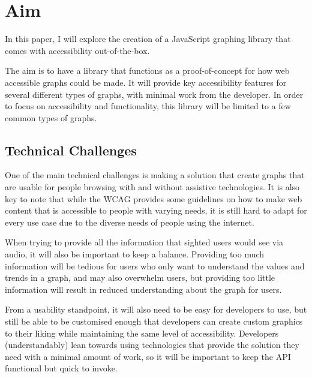 \documentclass[ %
                    author={Aleena Baig},
                supervisor={Dr Simon Lock},
                    degree={BSc},
                     title={On Making Web Accessible Graphs},
                  subtitle={},
                      year={2019} ]{dissertation}
\begin{document}
\section{Aim}

In this paper, I will explore the creation of a JavaScript graphing library that comes with accessibility out-of-the-box.

The aim is to have a library that functions as a proof-of-concept for how web accessible graphs could be made. It will provide key accessibility features for several different types of graphs, with minimal work from the developer. In order to focus on accessibility and functionality, this library will be limited to a few common types of graphs.

\subsection{Technical Challenges}

One of the main technical challenges is making a solution that create graphs that are usable for people browsing with and without assistive technologies. It is also key to note that while the WCAG provides some guidelines on how to make web content that is accessible to people with varying needs, it is still hard to adapt for every use case due to the diverse needs of people using the internet.

When trying to provide all the information that sighted users would see via audio, it will also be important to keep a balance. Providing too much information will be tedious for users who only want to understand the values and trends in a graph, and may also overwhelm users, but providing too little information will result in reduced understanding about the graph for users.

From a usability standpoint, it will also need to be easy for developers to use, but still be able to be customised enough that developers can create custom graphics to their liking while maintaining the same level of accessibility. Developers (understandably) lean towards using technologies that provide the solution they need with a minimal amount of work, so it will be important to keep the API functional but quick to invoke.


\end{document}
